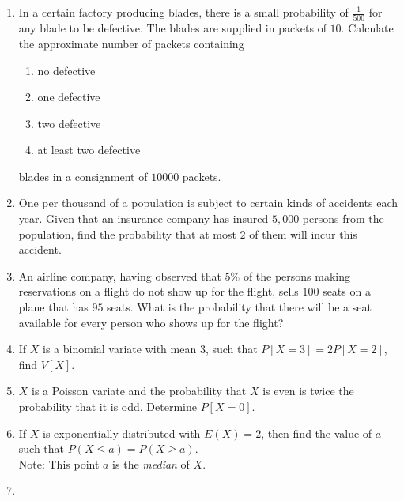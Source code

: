 \documentclass[svgnames]{amsart}
\begin{document}
\begin{enumerate}[leftmargin=*]
\item In a certain factory producing blades, there is a small probability of $\frac{1}{500}$ for any blade to be defective. The blades are supplied in packets of $10$. Calculate the approximate number of packets containing
\begin{enumerate}[label=(\roman*)]
	\item no defective
	\item one defective
	\item two defective
	\item at least two defective
\end{enumerate}
blades in a consignment of $10000$ packets.

\item One per thousand of a population is subject to certain kinds of accidents each year. Given that an insurance company has insured $5,000$ persons from the population, find the probability that at most $2$ of them will incur this accident.

\item An airline company, having observed that $5\%$ of the persons making reservations on a flight do not show up for the flight, sells $100$ seats on a plane that has $95$ seats. What is the probability that there will be a seat available for every person who shows up for the flight?

\item If $X$ is a binomial variate with mean $3$, such that $P[X = 3] = 2P[X = 2]$, find $V[X]$.

\item $X$ is a Poisson variate and the probability that $X$ is even is twice the probability that it is odd. Determine $P[X = 0]$.

\item  If $X$ is exponentially distributed with $E(X) = 2$, then find the value of $a$ such that $P(X \le a) = P(X \ge a)$.\\
{\small\color{blue!40!black}
		Note: This point $a$ is the \emph{median} of $X$.
}

\item 
 

\end{enumerate}
\end{document}
